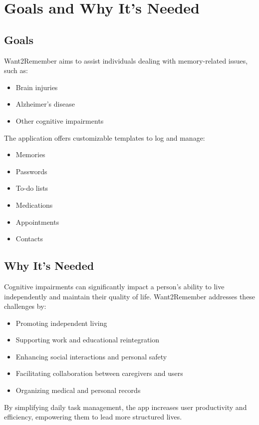 \documentclass{article}
\begin{document}
\section{Goals and Why It’s Needed}

\subsection{Goals}
Want2Remember aims to assist individuals dealing with memory-related issues, such as:

\begin{itemize}
\item Brain injuries
\item Alzheimer’s disease
\item Other cognitive impairments
\end{itemize}

The application offers customizable templates to log and manage:

\begin{itemize}
\item Memories
\item Passwords
\item To-do lists
\item Medications
\item Appointments
\item Contacts
\end{itemize}

\subsection{Why It’s Needed}
Cognitive impairments can significantly impact a person’s ability to live independently and maintain their quality of life. Want2Remember addresses these challenges by:

\begin{itemize}
\item Promoting independent living
\item Supporting work and educational reintegration
\item Enhancing social interactions and personal safety
\item Facilitating collaboration between caregivers and users
\item Organizing medical and personal records
\end{itemize}

By simplifying daily task management, the app increases user productivity and efficiency, empowering them to lead more structured lives.
\end{document}
